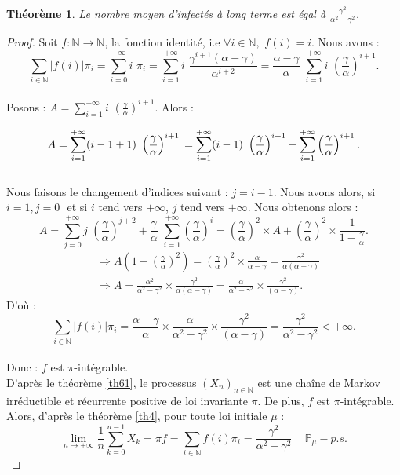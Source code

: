 \documentclass[12pt,a4paper]{report}
\newtheorem{thm}{Théorème}[section]
\theoremstyle{remark}
\begin{document}
\begin{thm}
Le nombre moyen d'infectés à long terme est égal à $\frac{\gamma^2}{\alpha^2-\gamma^2}$.
\end{thm}
\begin{proof}
Soit $f : \mathbb{N} \longrightarrow \mathbb{N}$, la fonction identité, i.e $\forall i \in \mathbb{N}, \, \, f(i) = i$. Nous avons :
$$\sum\limits_{i \in \mathbb{N}} |f(i)| \pi_i = \sum\limits_{i = 0}^{+\infty} i \, \, \pi_i = \sum\limits_{i = 1}^{+\infty} i \, \, \frac{\gamma^{i+1}(\alpha - \gamma)}{\alpha^{i+2}} = \frac{\alpha - \gamma}{\alpha} \, \, \sum\limits_{i = 1}^{+\infty} i \, \, \left(\frac{\gamma}{\alpha}\right)^{i+1}.$$
\\
Posons : $A = \sum\limits_{i = 1}^{+\infty} i \, \, \left(\frac{\gamma}{\alpha}\right)^{i+1}$. Alors :

$$A = \sum\limits_{i = 1}^{+\infty} (i - 1 + 1) \, \, \left(\frac{\gamma}{\alpha}\right)^{i+1} \\
= \sum\limits_{i = 1}^{+\infty} (i - 1) \, \, \left(\frac{\gamma}{\alpha}\right)^{i+1} + \sum\limits_{i = 1}^{+\infty}  \left(\frac{\gamma}{\alpha}\right)^{i+1}.$$
\\
Nous faisons le changement d'indices suivant : $j = i - 1$. Nous avons alors, si $i=1, j=0 \, \,$ et si $i$ tend vers $+\infty$, $j$ tend vers $+ \infty$. Nous obtenons alors :
\\
$$A = \sum\limits_{j = 0}^{+\infty} j \, \, \left(\frac{\gamma}{\alpha}\right)^{j+2} + \frac{\gamma}{\alpha} \, \, \sum\limits_{i = 1}^{+\infty}  \left(\frac{\gamma}{\alpha}\right)^{i} = \left(\frac{\gamma}{\alpha}\right)^2 \times A + \left(\frac{\gamma}{\alpha}\right)^2 \times \frac{1}{1 - \frac{\gamma}{\alpha}}.$$
\begin{align*}
&\Rightarrow A\left(1-\left(\frac{\gamma}{\alpha}\right)^2\right) = \left(\frac{\gamma}{\alpha}\right)^2 \times \frac{\alpha}{\alpha-\gamma} = \frac{\gamma^2}{\alpha\left(\alpha-\gamma\right)}\\
&\Rightarrow A = \frac{\alpha^2}{\alpha^2-\gamma^2}\times \frac{\gamma^2}{\alpha\left(\alpha-\gamma\right)}=\frac{\alpha}{\alpha^2-\gamma^2}\times \frac{\gamma^2}{\left(\alpha-\gamma\right)}.
\end{align*}
D'où : 
$$\sum\limits_{i \in \mathbb{N}} |f(i)| \pi_i =\frac{\alpha-\gamma }{\alpha} \times \frac{\alpha}{\alpha^2-\gamma^2}\times \frac{\gamma^2}{\left(\alpha-\gamma\right)} = \frac{\gamma^2}{\alpha^2-\gamma^2}< +\infty .$$
\\
Donc : $f$ est $\pi$-intégrable.\\

D'après le théorème \ref{th61}, le processus $(X_n)_{n\in\mathbb{N}}$ est une chaîne de Markov irréductible et récurrente positive de loi invariante $\pi$. De plus, $f$ est $\pi$-intégrable. Alors, d'après le théorème \ref{th4}, pour toute loi initiale $\mu$ : 
$$\lim\limits_{n \to +\infty} \frac{1}{n} \sum\limits_{k=0}^{n-1} X_k= \pi f = \sum\limits_{i\in\mathbb{N}} f(i)\pi_i= \frac{\gamma^2}{\alpha^2-\gamma^2} \text{   }\, \, \, \mathbb{P}_{\mu}-p.s.$$
\end{proof}
\end{document}
